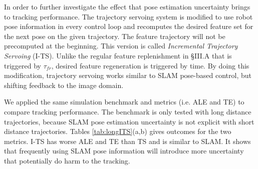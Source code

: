 In order to further investigate the effect that pose estimation uncertainty 
brings to tracking performance. 
The trajectory servoing system is modified to use robot pose information 
in every control loop and recomputes the desired feature set 
for the next pose on the given trajectory. 
The feature trajectory will not be precomputed at the beginning.
This version is called {\em Incremental Trajectory Servoing} (I-TS).
Unlike the regular feature replenishment in \S III.A that is triggered 
by $\tau_{fr}$, desired feature regeneration is triggered by time.
By doing this modification, trajectory servoing works similar to 
SLAM pose-based control, but shifting feedback to the image domain. 

We applied the same simulation benchmark and metrics (i.e. ALE and TE) 
to compare tracking performance. 
The benchmark is only tested with long distance trajectories, 
because SLAM pose estimation uncertainty is not explicit with short distance 
trajectories. Tables \ref{tab:longITS}(a,b) gives outcomes for the two metrics.
I-TS has worse ALE and TE than TS and is similar to SLAM.
It shows that frequently using SLAM pose information will introduce more 
uncertainty that potentially do harm to the tracking.


